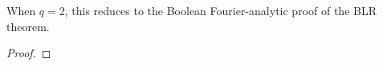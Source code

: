 \begin{theorem}
\label{rem:q2-special-case}
\leanok
When $q = 2$, this reduces to the Boolean Fourier-analytic proof
  of the BLR theorem.
\end{theorem}
\begin{proof}
\end{proof}

